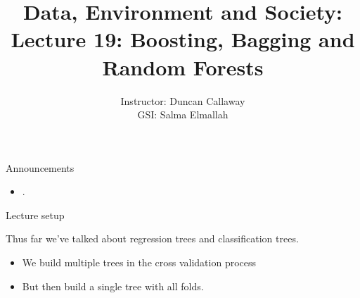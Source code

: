 \documentclass[mathserif, aspectratio=169]{beamer}
\title[Lecture 19] %
{Data, Environment and Society: \\{Lecture 19: Boosting, Bagging and Random Forests}}
\author[ER131: Data, Environment and Society] 
{Instructor: Duncan Callaway\\
GSI: Salma Elmallah}
\institute[UC Berkeley] %
 {\small{ \bf November 5, 2019}}
\date[November 5, 2019]
\begin{document}
\frame{
  \titlepage
}

\begin{frame}{Announcements}

\begin{itemize}
\item .
\end{itemize}

\end{frame}

\begin{frame}{Lecture setup}

Thus far we've talked about regression trees and classification trees.
\begin{itemize}
\item We build multiple trees in the cross validation process
\item But then build a single tree with all folds.
\end{itemize}



\end{frame}
\end{document}
